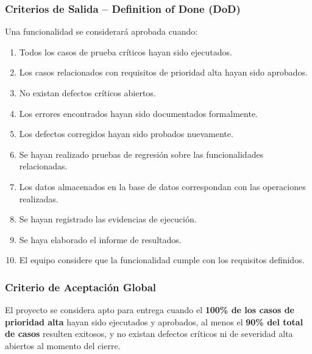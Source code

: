 \documentclass[11pt,a4paper]{article}
\begin{document}
\subsubsection{Criterios de Salida -- Definition of Done (DoD)}
Una funcionalidad se considerará aprobada cuando:
\begin{enumerate}
    \item Todos los casos de prueba críticos hayan sido ejecutados.
    \item Los casos relacionados con requisitos de prioridad alta hayan sido aprobados.
    \item No existan defectos críticos abiertos.
    \item Los errores encontrados hayan sido documentados formalmente.
    \item Los defectos corregidos hayan sido probados nuevamente.
    \item Se hayan realizado pruebas de regresión sobre las funcionalidades relacionadas.
    \item Los datos almacenados en la base de datos correspondan con las operaciones realizadas.
    \item Se hayan registrado las evidencias de ejecución.
    \item Se haya elaborado el informe de resultados.
    \item El equipo considere que la funcionalidad cumple con los requisitos definidos.
\end{enumerate}

\subsubsection{Criterio de Aceptación Global}
El proyecto se considera apto para entrega cuando el \textbf{100\% de los casos de prioridad alta} hayan sido ejecutados y aprobados, al menos el \textbf{90\% del total de casos} resulten exitosos, y no existan defectos críticos ni de severidad alta abiertos al momento del cierre.
\end{document}
